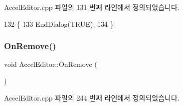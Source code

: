 Accel\+Editor.\+cpp 파일의 131 번째 라인에서 정의되었습니다.


\begin{DoxyCode}
132 \{
133   EndDialog(TRUE);
134 \}
\end{DoxyCode}
\mbox{\label{class_accel_editor_a40b74b67b95694245502b15ceedd278c}} 
\subsubsection{\texorpdfstring{On\+Remove()}{OnRemove()}}
{\footnotesize\ttfamily void Accel\+Editor\+::\+On\+Remove (\begin{DoxyParamCaption}{ }\end{DoxyParamCaption})\hspace{0.3cm}{\ttfamily [protected]}}



Accel\+Editor.\+cpp 파일의 244 번째 라인에서 정의되었습니다.


